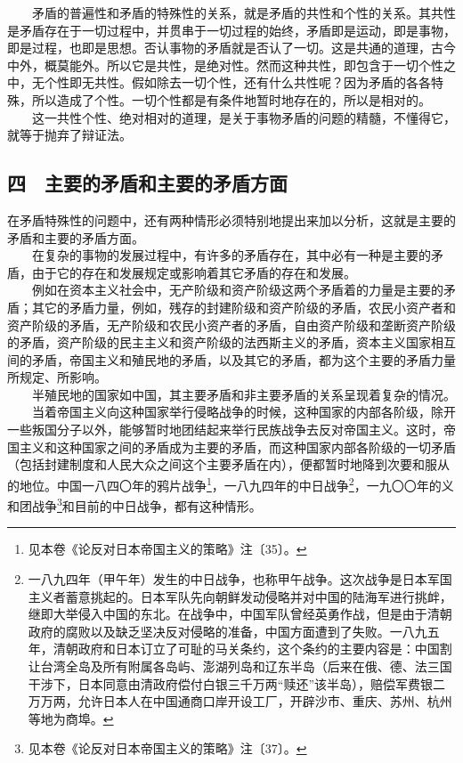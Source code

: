 \documentclass[cn,11pt,chinese]{elegantbook}
\def\myformat#1{\hfil\hfil #1}
\begin{document}
　　矛盾的普遍性和矛盾的特殊性的关系，就是矛盾的共性和个性的关系。其共性是矛盾存在于一切过程中，并贯串于一切过程的始终，矛盾即是运动，即是事物，即是过程，也即是思想。否认事物的矛盾就是否认了一切。这是共通的道理，古今中外，概莫能外。所以它是共性，是绝对性。然而这种共性，即包含于一切个性之中，无个性即无共性。假如除去一切个性，还有什么共性呢？因为矛盾的各各特殊，所以造成了个性。一切个性都是有条件地暂时地存在的，所以是相对的。\\
　　这一共性个性、绝对相对的道理，是关于事物矛盾的问题的精髓，不懂得它，就等于抛弃了辩证法。\\
\subsection*{\myformat{四　主要的矛盾和主要的矛盾方面}}
在矛盾特殊性的问题中，还有两种情形必须特别地提出来加以分析，这就是主要的矛盾和主要的矛盾方面。\\
　　在复杂的事物的发展过程中，有许多的矛盾存在，其中必有一种是主要的矛盾，由于它的存在和发展规定或影响着其它矛盾的存在和发展。\\
　　例如在资本主义社会中，无产阶级和资产阶级这两个矛盾着的力量是主要的矛盾；其它的矛盾力量，例如，残存的封建阶级和资产阶级的矛盾，农民小资产者和资产阶级的矛盾，无产阶级和农民小资产者的矛盾，自由资产阶级和垄断资产阶级的矛盾，资产阶级的民主主义和资产阶级的法西斯主义的矛盾，资本主义国家相互间的矛盾，帝国主义和殖民地的矛盾，以及其它的矛盾，都为这个主要的矛盾力量所规定、所影响。\\
　　半殖民地的国家如中国，其主要矛盾和非主要矛盾的关系呈现着复杂的情况。\\
　　当着帝国主义向这种国家举行侵略战争的时候，这种国家的内部各阶级，除开一些叛国分子以外，能够暂时地团结起来举行民族战争去反对帝国主义。这时，帝国主义和这种国家之间的矛盾成为主要的矛盾，而这种国家内部各阶级的一切矛盾（包括封建制度和人民大众之间这个主要矛盾在内），便都暂时地降到次要和服从的地位。中国一八四〇年的鸦片战争\footnote[21]{ 见本卷《论反对日本帝国主义的策略》注〔35〕。}，一八九四年的中日战争\footnote[22]{ 一八九四年（甲午年）发生的中日战争，也称甲午战争。这次战争是日本军国主义者蓄意挑起的。日本军队先向朝鲜发动侵略并对中国的陆海军进行挑衅，继即大举侵入中国的东北。在战争中，中国军队曾经英勇作战，但是由于清朝政府的腐败以及缺乏坚决反对侵略的准备，中国方面遭到了失败。一八九五年，清朝政府和日本订立了可耻的马关条约，这个条约的主要内容是：中国割让台湾全岛及所有附属各岛屿、澎湖列岛和辽东半岛（后来在俄、德、法三国干涉下，日本同意由清政府偿付白银三千万两“赎还”该半岛），赔偿军费银二万万两，允许日本人在中国通商口岸开设工厂，开辟沙市、重庆、苏州、杭州等地为商埠。}，一九〇〇年的义和团战争\footnote[23]{ 见本卷《论反对日本帝国主义的策略》注〔37〕。}和目前的中日战争，都有这种情形。\\
\end{document}
